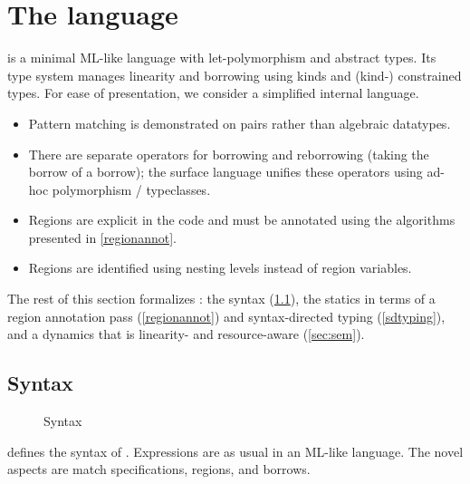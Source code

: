 \section{The \lang language}

\lang is a minimal ML-like language with
let-polymorphism and abstract types. Its type system manages
linearity and borrowing using kinds and (kind-) constrained types.
For ease of presentation, we consider a simplified internal language.
\begin{itemize}[topsep=0pt]
\item Pattern matching is demonstrated on pairs rather than algebraic
  datatypes.
\item There are separate operators for borrowing and reborrowing (taking
  the borrow of a borrow); the surface language unifies these
  operators using ad-hoc polymorphism / typeclasses.
\item Regions are explicit in the code and must be annotated using the
  algorithms presented in \cref{regionannot}.
\item Regions are identified using nesting levels instead of region
  variables.
\end{itemize}

The rest of this section formalizes  \lang: the syntax (\cref{syntax}),
the statics in terms of a region annotation pass (\cref{regionannot}) and
syntax-directed typing (\cref{sdtyping}),
and a dynamics that is linearity- and resource-aware (\cref{sec:sem}).

\subsection{Syntax}
\label{syntax}

\begin{figure}[!tb]
  
  \vspace{-7pt}
  \caption{Syntax}
  \label{grammar}
  \vspace{-10pt}
\end{figure}


 defines the syntax of \lang. Expressions are as usual
in an ML-like language.  The novel aspects are match
specifications, regions, and borrows.

